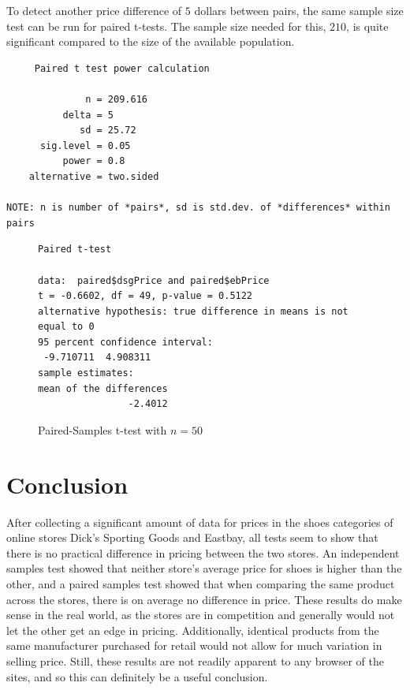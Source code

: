 \documentclass[12pt]{article}
\begin{document}
To detect another price difference of $5$ dollars between pairs, the same sample size test can be run for paired t-tests. The sample size needed for this, $210$, is quite significant
compared to the size of the available population.
\begin{verbatim}
     Paired t test power calculation 

              n = 209.616
          delta = 5
             sd = 25.72
      sig.level = 0.05
          power = 0.8
    alternative = two.sided

NOTE: n is number of *pairs*, sd is std.dev. of *differences* within pairs
\end{verbatim}

 

\begin{figure}[h]
\begin{verbatim}
Paired t-test

data:  paired$dsgPrice and paired$ebPrice
t = -0.6602, df = 49, p-value = 0.5122
alternative hypothesis: true difference in means is not equal to 0
95 percent confidence interval:
 -9.710711  4.908311
sample estimates:
mean of the differences 
                -2.4012 
\end{verbatim}
\caption{Paired-Samples t-test with $n=50$}
\end{figure}

\section{Conclusion}
After collecting a significant amount of data for prices in the shoes categories of online stores Dick's Sporting Goods and Eastbay, all tests seem to show that there is no practical 
difference in pricing between the two stores. An independent samples test showed that neither store's average price for shoes is higher than the other, and a paired samples test showed that when comparing the same product across the stores, there is on average no difference in price. These results do make sense in the real world, as the stores are in competition and
generally would not let the other get an edge in pricing. Additionally, identical products from the same manufacturer purchased for retail would not allow for much variation in selling price.
Still, these results are not readily apparent to any browser of the sites, and so this can definitely be a useful conclusion. 
 
\end{document}
